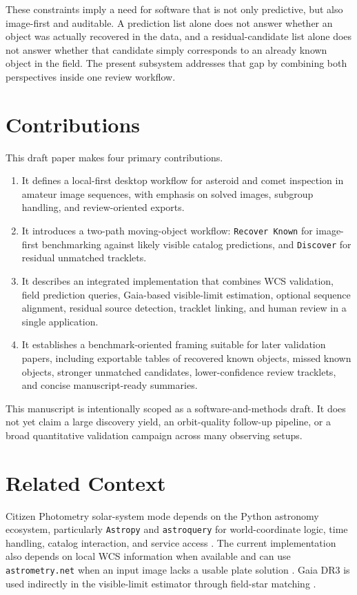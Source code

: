 \documentclass[modern]{aastex701}
\begin{document}
These constraints imply a need for software that is not only predictive, but also image-first and auditable. A prediction list alone does not answer whether an object was actually recovered in the data, and a residual-candidate list alone does not answer whether that candidate simply corresponds to an already known object in the field. The present subsystem addresses that gap by combining both perspectives inside one review workflow.

\section{Contributions}\label{sec:contributions}

This draft paper makes four primary contributions.

\begin{enumerate}
\item It defines a local-first desktop workflow for asteroid and comet inspection in amateur image sequences, with emphasis on solved images, subgroup handling, and review-oriented exports.
\item It introduces a two-path moving-object workflow: \texttt{Recover Known} for image-first benchmarking against likely visible catalog predictions, and \texttt{Discover} for residual unmatched tracklets.
\item It describes an integrated implementation that combines WCS validation, field prediction queries, Gaia-based visible-limit estimation, optional sequence alignment, residual source detection, tracklet linking, and human review in a single application.
\item It establishes a benchmark-oriented framing suitable for later validation papers, including exportable tables of recovered known objects, missed known objects, stronger unmatched candidates, lower-confidence review tracklets, and concise manuscript-ready summaries.
\end{enumerate}

This manuscript is intentionally scoped as a software-and-methods draft. It does not yet claim a large discovery yield, an orbit-quality follow-up pipeline, or a broad quantitative validation campaign across many observing setups.

\section{Related Context}\label{sec:related}

Citizen Photometry solar-system mode depends on the Python astronomy ecosystem, particularly \texttt{Astropy} and \texttt{astroquery} for world-coordinate logic, time handling, catalog interaction, and service access \citep{astropy2013,astropy2018,ginsburg2019}. The current implementation also depends on local WCS information when available and can use \texttt{astrometry.net} when an input image lacks a usable plate solution \citep{astrometrynet}. Gaia DR3 is used indirectly in the visible-limit estimator through field-star matching \citep{gaia-dr3}.
\end{document}
